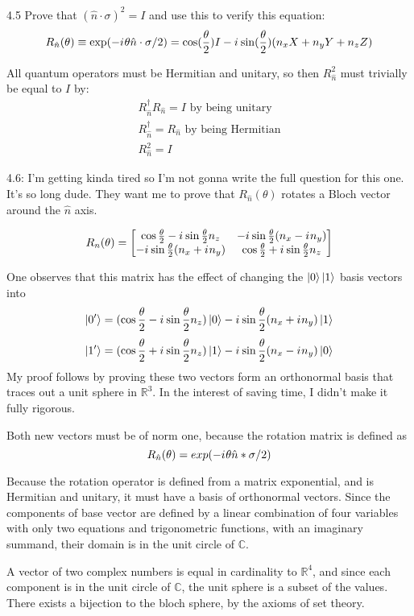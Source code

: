 \documentclass[12pt, letterpaper, twoside]{article}
\newcommand{\iu}{{i\mkern1mu}}
\newcommand{\halftheta}{\frac{\theta}{2}}
\newcommand{\twoXtwo}[4]{\begin{bmatrix}
    #1 & #3 \\
    #2 & #4
\end{bmatrix}}
\newcommand{\Rn}{\twoXtwo{
    \cos{\halftheta} - \iu \sin{\halftheta}n_z
    }{
        -\iu \sin{\halftheta}(n_x + \iu n_y)
    }{
        -\iu \sin{\halftheta}(n_x - \iu n_y)
    }{
        \cos{\halftheta} + \iu \sin{\halftheta}n_z
        }}
\begin{document}
4.5 Prove that $(\hat{n} \cdot \sigma)^2 = I$ and use this to verify this equation:
$$
	R_{\hat{n}}(\theta) \equiv \exp(-\iu \theta \hat{n} \cdot \sigma/2) = \cos(\frac{\theta}{2})I - \iu \sin(\frac{\theta}{2})(n_xX + n_yY + n_zZ)
$$

All quantum operators must be Hermitian and unitary, so then $R_{\hat{n}}^2$ must trivially be equal to $I$ by:
\begin{subequations}
	\begin{align}
		R_{\hat{n}}^\dagger R_{\hat{n}} = I \text{ by being unitary} \\
		R_{\hat{n}}^\dagger = R_{\hat{n}} \text{ by being Hermitian} \\
		R_{\hat{n}}^2 = I
	\end{align}
\end{subequations}

4.6: I'm getting kinda tired so I'm not gonna write the full question for this one. It's so long dude. They want me to prove that $R_{\hat{n}}(\theta)$ rotates a Bloch vector around the $\hat{n}$ axis.

$$
	R_n(\theta) = \Rn
$$

One observes that this matrix has the effect of changing the $\ket{0}\ket{1}$ basis vectors into
$$
	\ket{0'} = (\cos{\halftheta} - \iu \sin{\halftheta}n_z)\ket{0} - \iu\sin{\halftheta}(n_x + \iu n_y) \ket{1}
$$
$$
	\ket{1'} = (\cos{\halftheta} + \iu \sin{\halftheta}n_z)\ket{1} -  \iu\sin{\halftheta}(n_x - \iu n_y) \ket{0}
$$
My proof follows by proving these two vectors form an orthonormal basis that traces out a unit sphere in $\mathbb{R}^3$. In the interest of saving time, I didn't make it fully rigorous.

Both new vectors must be of norm one, because the rotation matrix is defined as
$$
	R_{\hat{n}}(\theta) = exp(-\iu \theta \hat{n} * \sigma/2)
$$

Because the rotation operator is defined from a matrix exponential, and is Hermitian and unitary, it must have a basis of orthonormal vectors. Since the components of base vector are defined by a linear combination of four variables with only two equations and trigonometric functions, with an imaginary summand, their domain is in the unit circle of $\mathbb{C}$.

A vector of two complex numbers is equal in cardinality to $\mathbb{R}^4$, and since each component is in the unit circle of $\mathbb{C}$, the unit sphere is a subset of the values. There exists a bijection to the bloch sphere, by the axioms of set theory.
\end{document}

